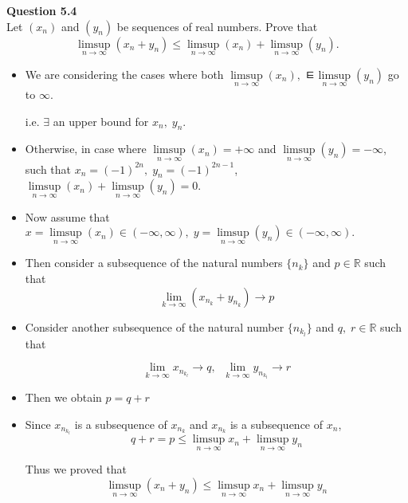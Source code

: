 \documentclass[12pt]{article}
\begin{document}
\newpage
\textbf{Question 5.4} \\
Let $(x_n)$ and $(y_n)$ be sequences of real numbers. Prove that
$$ 
\limsup\limits_{n\rightarrow\infty} (x_n + y_n) \le
\limsup\limits_{n\rightarrow\infty} (x_n) + \limsup\limits_{n\rightarrow\infty} (y_n).
$$
\begin{itemize}
    \item We are considering the cases where both 
    $\limsup\limits_{n\rightarrow\infty} (x_n),\;ㅌ \limsup\limits_{n\rightarrow\infty} (y_n)$ go to $\infty$.
    
    \vspace{0.05\baselineskip}
    
    i.e. $\exists$ an upper bound for $x_n,\; y_n$.
    
    \item Otherwise, in case where $\limsup\limits_{n\rightarrow\infty} (x_n) = +\infty$ and $\limsup\limits_{n\rightarrow\infty} (y_n) = -\infty$,\\
    such that $x_n = (-1)^{2n},\; y_n=(-1)^{2n-1}$, $\limsup\limits_{n\rightarrow\infty} (x_n) + \limsup\limits_{n\rightarrow\infty} (y_n)=0$.
    
    \item Now assume that 
    $x =\limsup\limits_{n\rightarrow\infty} (x_n) \in(-\infty,\infty),\; 
    y=\limsup\limits_{n\rightarrow\infty} (y_n) \in(-\infty,\infty).$\\
    
    \item Then consider a subsequence of the natural numbers $\{n_k\}$ and $p\in\mathbb{R}$ such that 
    $$\lim_{k \to \infty} (x_{n_k} +y_{n_k})\rightarrow p$$
    
\item Consider another subsequence of the natural number $\{n_{k_l}\}$ and $q,\;r\in\mathbb{R}$ such that 

$$\lim_{k \to \infty} x_{n_{k_l}}\rightarrow q,\;\;
\lim_{k \to \infty} y_{n_{k_l}}\rightarrow r
$$

\item Then we obtain $p=q+r$
\item Since $x_{n_{k_l}}$ is a subsequence of $x_{n_k}$ and $x_{n_k}$ is  a subsequence of $x_n$,
$$
q+r = p \le
\limsup\limits_{n\to\infty} x_n+
\limsup\limits_{n\to\infty} y_n
$$

Thus we proved that 
$$
\limsup\limits_{n\to\infty} (x_n + y_n) \le
\limsup\limits_{n\to\infty} x_n+
\limsup\limits_{n\to\infty} y_n
$$
\end{itemize}
\end{document}
